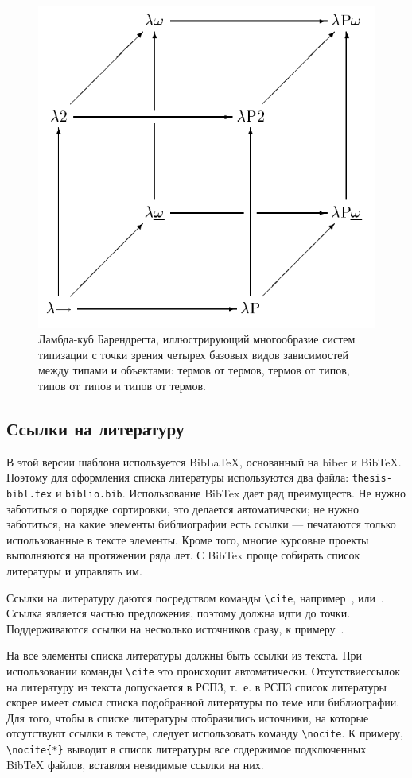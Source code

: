 \begin{figure}[t]%
	\begin{center}
		\includegraphics[width=.5\columnwidth]{./img/lambda-cube.png}%
	\end{center}
	\caption{Ламбда-куб Барендрегта, иллюстрирующий многообразие систем типизации с точки зрения четырех базовых видов зависимостей между типами и объектами: термов от термов, термов от типов, типов от типов и типов от термов.}%
	\label{pic:lambda-cube-long-caption}%
\end{figure}

\subsection{Ссылки на литературу}

В этой версии шаблона используется BibLaTeX, основанный на biber и BibTeX.
Поэтому для оформления списка литературы используются два файла:
\texttt{thesis-bibl.tex} и \texttt{biblio.bib}. Использование BibTex дает ряд
преимуществ. Не нужно заботиться о порядке сортировки, это делается
автоматически; не нужно заботиться, на какие элементы библиографии есть ссылки
--- печатаются только использованные в тексте элементы. Кроме того, многие
курсовые проекты выполняются на протяжении ряда лет. С BibTex проще собирать
список литературы и управлять им.

Ссылки на литературу даются посредством команды \texttt{\textbackslash{}cite},
например~\cite{Lermontov}, или~\cite{Pokrovski}. Ссылка является частью
предложения, поэтому должна идти до точки. Поддерживаются ссылки на несколько
источников сразу, к примеру~\cite{Borozda,Lagkueva,Methodology,Lermontov}.

На все элементы списка литературы должны быть ссылки из текста. При
использовании команды \texttt{\textbackslash{}cite} это происходит
автоматически. Отсутствиессылок на литературу из текста допускается в РСПЗ,
т.~е. в РСПЗ список литературы скорее имеет смысл списка подобранной литературы
по теме или библиографии. Для того, чтобы в списке литературы отобразились
источники, на которые отсутствуют ссылки в тексте, следует использовать команду
\texttt{\textbackslash{}nocite}. К примеру, \texttt{\textbackslash{}nocite\{*\}}
выводит в список литературы все содержимое подключенных BibTeX файлов, вставляя
невидимые ссылки на них.


